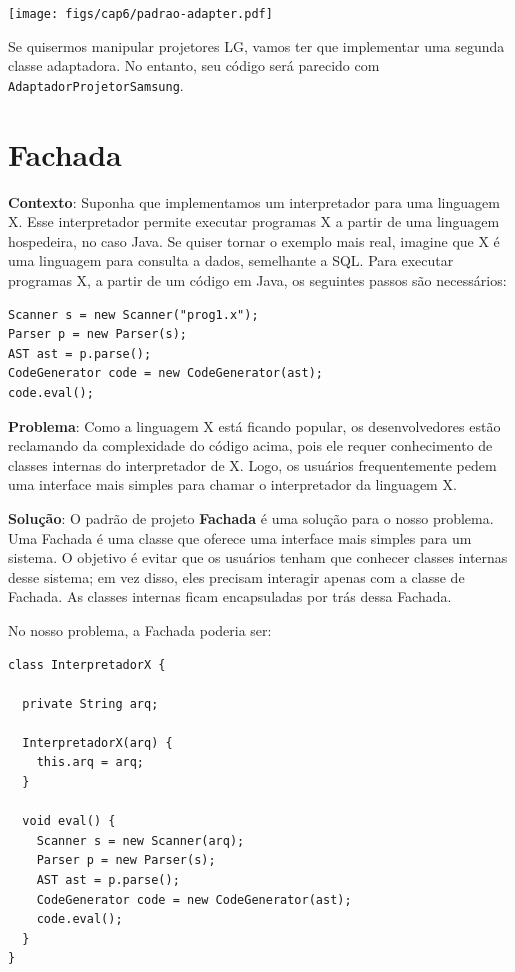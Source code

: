 \documentclass[
  11pt,
  twoside]{book}
\newcommand{\passthrough}[1]{#1}
\let\origfigure\figure
\let\endorigfigure\endfigure
\renewenvironment{figure}[1][2] {
    \expandafter\origfigure\expandafter[!h]
} {
    \endorigfigure
}
\begin{document}
\begin{figure}
\centering
\texttt{[image: figs/cap6/padrao-adapter.pdf]}
\caption{Padrão de projeto Adaptador}
\end{figure}

Se quisermos manipular projetores LG, vamos ter que implementar uma
segunda classe adaptadora. No entanto, seu código será parecido com
\passthrough{\lstinline!AdaptadorProjetorSamsung!}.

\hypertarget{fachada}{%
\section{Fachada}\label{fachada}}

 

\textbf{Contexto}: Suponha que implementamos um interpretador para uma
linguagem X. Esse interpretador permite executar programas X a partir de
uma linguagem hospedeira, no caso Java. Se quiser tornar o exemplo mais
real, imagine que X é uma linguagem para consulta a dados, semelhante a
SQL. Para executar programas X, a partir de um código em Java, os
seguintes passos são necessários:

\begin{lstlisting}
Scanner s = new Scanner("prog1.x");
Parser p = new Parser(s);
AST ast = p.parse();
CodeGenerator code = new CodeGenerator(ast);
code.eval();
\end{lstlisting}

\textbf{Problema}: Como a linguagem X está ficando popular, os
desenvolvedores estão reclamando da complexidade do código acima, pois
ele requer conhecimento de classes internas do interpretador de X. Logo,
os usuários frequentemente pedem uma interface mais simples para chamar
o interpretador da linguagem X.

\textbf{Solução}: O padrão de projeto \textbf{Fachada} é uma solução
para o nosso problema. Uma Fachada é uma classe que oferece uma
interface mais simples para um sistema. O objetivo é evitar que os
usuários tenham que conhecer classes internas desse sistema; em vez
disso, eles precisam interagir apenas com a classe de Fachada. As
classes internas ficam encapsuladas por trás dessa Fachada.

No nosso problema, a Fachada poderia ser:

\begin{lstlisting}
class InterpretadorX {

  private String arq;

  InterpretadorX(arq) {
    this.arq = arq;
  }

  void eval() {
    Scanner s = new Scanner(arq);
    Parser p = new Parser(s);
    AST ast = p.parse();
    CodeGenerator code = new CodeGenerator(ast);
    code.eval();
  }
}
\end{lstlisting}
\end{document}
